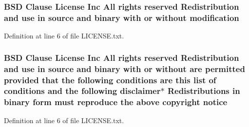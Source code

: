 \subsubsection[{\texorpdfstring{modification}{modification}}]{\setlength{\rightskip}{0pt plus 5cm}B\+SD Clause License Inc All rights reserved Redistribution and use in source and binary with or without modification}\hypertarget{LICENSE_8txt_afdee13c8c8c1061395c59e5c5de1a3c6}{}\label{LICENSE_8txt_afdee13c8c8c1061395c59e5c5de1a3c6}


Definition at line 6 of file L\+I\+C\+E\+N\+S\+E.\+txt.

\subsubsection[{\texorpdfstring{notice}{notice}}]{\setlength{\rightskip}{0pt plus 5cm}B\+SD Clause License Inc All rights reserved Redistribution and use in source and binary with or without are permitted provided that the following conditions are this list of conditions and the following disclaimer$\ast$ Redistributions in binary form must reproduce the above copyright notice}\hypertarget{LICENSE_8txt_a8a2e1e600c30d90e063df4e722f9052b}{}\label{LICENSE_8txt_a8a2e1e600c30d90e063df4e722f9052b}


Definition at line 6 of file L\+I\+C\+E\+N\+S\+E.\+txt.

